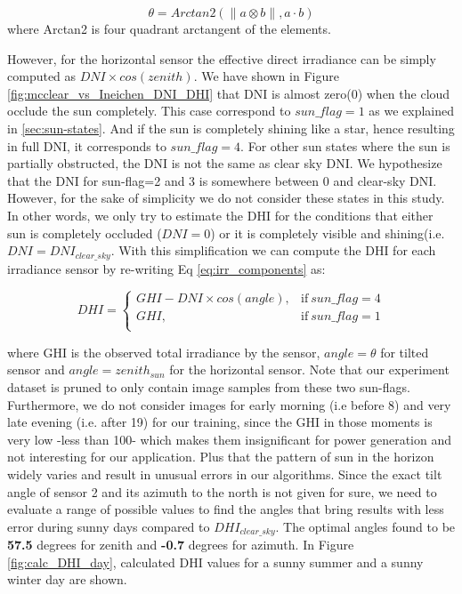 \begin{equation}
\label{eq:angle_sun_tilted}
\theta = Arctan2(\| a \otimes b \|, a \cdot b)
\end{equation} 
where Arctan2 is four quadrant arctangent of the elements.

However, for the horizontal sensor the effective direct irradiance can be simply computed as $DNI \times cos(zenith)$. We have shown in Figure \ref{fig:mcclear_vs_Ineichen_DNI_DHI} that DNI is almost zero(0) when the cloud occlude the sun completely. This case correspond to $sun\_flag=1$ as we explained in \ref{sec:sun-states}. And if the sun is completely shining like a star, hence resulting in full DNI, it corresponds to  $sun\_flag=4$. For other sun states where the sun is partially obstructed, the DNI is not the same as clear sky DNI. We hypothesize that the DNI for sun-flag=2 and 3 is somewhere between 0 and clear-sky DNI. However, for the sake of simplicity we do not consider these states in this study. In other words, we only try to estimate the DHI for the conditions that either sun is completely occluded ($DNI=0$) or it is completely visible and shining(i.e. $DNI=DNI_{clear\_sky}$. With this simplification we can compute the DHI for each irradiance sensor by re-writing Eq \ref{eq:irr_components} as:

\begin{equation}
\label{eq:DHI_eq}
DHI =
    \begin{cases}
      GHI - DNI \times cos (angle), & \text{if}\ sun\_flag=4 \\
      GHI, & \text{if}\ sun\_flag=1 \\
    \end{cases}
\end{equation}

where GHI is the observed total irradiance by the sensor, $angle=\theta$ for tilted sensor and $angle=zenith_{sun}$ for the horizontal sensor. Note that our experiment dataset is pruned to only contain image samples from these two sun-flags. Furthermore, we do not consider images for early morning (i.e before 8) and very late evening (i.e. after 19) for our training, since the GHI in those moments is very low -less than 100- which makes them insignificant for power generation and not interesting for our application. Plus that the pattern of sun in the horizon widely varies and result in unusual errors in our algorithms. Since the exact tilt angle of sensor 2 and its azimuth to the north is not given for sure, we need to evaluate a range of possible values to find the angles that bring results with less error during sunny days compared to $DHI_{clear\_sky}$.  The optimal angles found to be \textbf{57.5} degrees for zenith and \textbf{-0.7} degrees for azimuth. 
In Figure \ref{fig:calc_DHI_day}, calculated DHI values for a sunny summer and a sunny winter day are shown.

